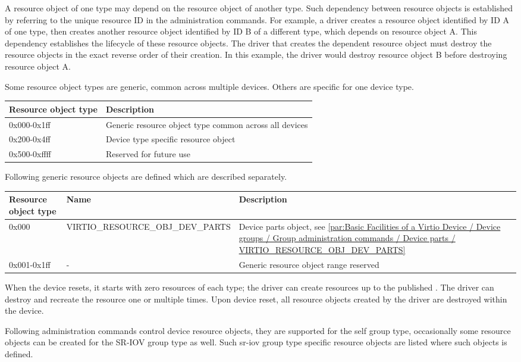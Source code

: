 A resource object of one type may depend on the resource object of another type.
Such dependency between resource objects is established by referring to the unique
resource ID in the administration commands. For example, a driver creates a
resource object identified by ID A of one type, then creates another resource
object identified by ID B of a different type, which depends on resource object
A. This dependency establishes the lifecycle of these resource objects. The driver
that creates the dependent resource object must destroy the resource objects in the
exact reverse order of their creation. In this example, the driver would
destroy resource object B before destroying resource object A.

Some resource object types are generic, common across multiple devices.
Others are specific for one device type.

\begin{tabular}{|l|l|}
\hline
Resource object type & Description \\
\hline \hline
0x000-0x1ff & Generic resource object type common across all devices \\
\hline
0x200-0x4ff & Device type specific resource object \\
\hline
0x500-0xffff & Reserved for future use  \\
\hline
\end{tabular}

Following generic resource objects are defined which are described separately.

\begin{tabularx}{\textwidth}{ |X||X|X| }
\hline
Resource object type & Name & Description \\
\hline \hline
0x000 & VIRTIO_RESOURCE_OBJ_DEV_PARTS & Device parts object, see \ref{par:Basic Facilities of a Virtio Device / Device groups / Group administration commands / Device parts / VIRTIO_RESOURCE_OBJ_DEV_PARTS} \\
\hline
0x001-0x1ff & - & Generic resource object range reserved \\
\hline
\hline
\end{tabularx}

When the device resets, it starts with zero resources of each type; the driver
can create resources up to the published . The driver can
destroy and recreate the resource one or multiple times. Upon device reset,
all resource objects created by the driver are destroyed within the device.

Following administration commands control device resource objects,
they are supported for the self group type, occasionally some resource
objects can be created for the SR-IOV group type as well. Such sr-iov group
type specific resource objects are listed where such objects is defined.

